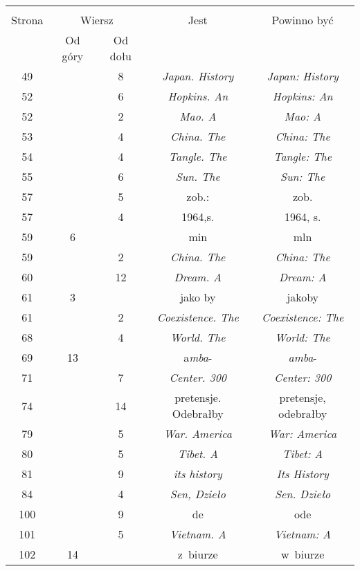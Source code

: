 \documentclass[a4paper,11pt]{article}
\begin{document}
\begin{center}
  \begin{tabular}{|c|c|c|c|c|}
    \hline
    & \multicolumn{2}{c|}{} & & \\
    Strona & \multicolumn{2}{c|}{Wiersz} & Jest
                              & Powinno być \\ \cline{2-3}
    & Od góry & Od dołu & & \\
    \hline
    49  & &  8 & \textit{Japan. History} & \textit{Japan: History} \\
    52  & &  6 & \textit{Hopkins. An} & \textit{Hopkins: An} \\
    52  & &  2 & \textit{Mao. A} & \textit{Mao: A} \\
    53  & &  4 & \textit{China. The} & \textit{China: The} \\
    54  & &  4 & \textit{Tangle. The} & \textit{Tangle: The} \\
    55  & &  6 & \textit{Sun. The} & \textit{Sun: The} \\
    57  & &  5 & zob.: & zob. \\
    57  & &  4 & 1964,s. & 1964, s. \\
    59  &  6 & & min & mln \\
    59  & &  2 & \textit{China. The} & \textit{China: The} \\
    60  & & 12 & \textit{Dream. A} & \textit{Dream: A} \\
    61  &  3 & & jako by & jakoby \\
    61  & &  2 & \textit{Coexistence. The} & \textit{Coexistence: The} \\
    68  & &  4 & \textit{World. The} & \textit{World: The} \\
    69  & 13 & & a\textit{mba}- & \textit{amba}- \\
    71  & &  7 & \textit{Center. 300} & \textit{Center: 300} \\
    74  & & 14 & pretensje. Odebrałby & pretensje, odebrałby \\
    79  & &  5 & \textit{War. America} & \textit{War: America} \\
    80  & &  5 & \textit{Tibet. A} & \textit{Tibet: A} \\
    81  & &  9 & \textit{its history} & \textit{Its History} \\
    84  & &  4 & \textit{Sen, Dzieło} & \textit{Sen. Dzieło} \\
    100 & &  9 & de & ode \\
    101 & &  5 & \textit{Vietnam. A} & \textit{Vietnam: A} \\
    102 & 14 & & z~biurze & w~biurze \\

\end{tabular}
\end{center}
\end{document}
